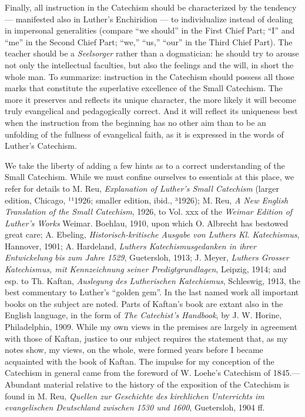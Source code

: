 Finally, all instruction in the Catechism should be characterized by the tendency — manifested also in Luther’s Enchiridion — to individualize instead of dealing in impersonal generalities (compare “we should” in the First Chief Part; “I” and “me” in the Second Chief Part; “we,” “us,” “our” in the Third Chief Part). The teacher should be a \emph{Seelsorger} rather than a dogmatician: he should try to arouse not only the intellectual faculties, but also the feelings and the will, in short the whole man. To summarize: instruction in the Catechism should possess all those marks that constitute the superlative excellence of the Small Catechism. The more it preserves and reflects its unique character, the more likely it will become truly evangelical and pedagogically correct. And it will reflect its uniqueness best when the instruction from the beginning has no other aim than to be an unfolding of the fullness of evangelical faith, as it is expressed in the words of Luther’s Catechism.

We take the liberty of adding a few hints as to a correct understanding of the Small Catechism. While we must confine ourselves to essentials at this place, we refer for details to M. Reu, \emph{Explanation of Luther’s Small Catechism} (larger edition, Chicago, ¹¹1926; smaller edition, ibid., ³1926); M. Reu, \emph{A New English Translation of the Small Catechism}, 1926, to Vol. xxx of the \emph{Weimar Edition of Luther’s Works} Weimar. Boehlau, 1910, upon which O. Albrecht has bestowed great care; A. Ebeling, \emph{Historisch-kritische Ausgabe von Luthers Kl. Katechismus}, Hannover, 1901; A. Hardeland, \emph{Luthers Katechismusgedanken in ihrer Entwickelung bis zum Jahre 1529}, Guetersloh, 1913; J. Meyer, \emph{Luthers Grosser Katechismus, mit Kennzeichnung seiner Predigtgrundlagen},
Leipzig, 1914; and esp. to Th. Kaftan, \emph{Auslegung des Lutherischen Katechismus}, Schleswig, 1913, the best commentary to Luther’s “golden gem”. In the last named work all important books on the subject are noted. Parts of Kaftan’s book are extant also in the English language, in the form of \emph{The Catechist’s Handbook}, by J. W. Horine, Philadelphia, 1909. While my own views in the premises are largely in agreement with those of Kaftan, justice to our subject requires the statement that, as my notes show, my views, on the whole, were formed years before I became acquainted with the book of Kaftan. The impulse for my conception of the Catechism in general came from the foreword of W. Loehe’s Catechism of 1845.—Abundant material relative to the history of the exposition of the Catechism is found in M. Reu, \emph{Quellen zur Geschichte des kirchlichen Unterrichts im evangelischen Deutschland zwischen 1530 und 1600}, Guetersloh, 1904 ff.

